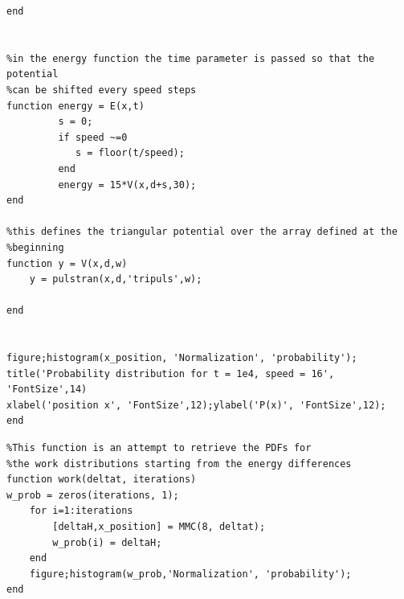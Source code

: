 \documentclass[11pt,letterpaper]{article}
\begin{document}
\begin{lstlisting}
end


%in the energy function the time parameter is passed so that the potential
%can be shifted every speed steps
function energy = E(x,t)
         s = 0;
         if speed ~=0
            s = floor(t/speed);
         end
         energy = 15*V(x,d+s,30);
end 

%this defines the triangular potential over the array defined at the
%beginning
function y = V(x,d,w)
    y = pulstran(x,d,'tripuls',w);
      
end


figure;histogram(x_position, 'Normalization', 'probability');
title('Probability distribution for t = 1e4, speed = 16', 'FontSize',14)
xlabel('position x', 'FontSize',12);ylabel('P(x)', 'FontSize',12);
end
\end{lstlisting}

\begin{lstlisting}
%This function is an attempt to retrieve the PDFs for 
%the work distributions starting from the energy differences
function work(deltat, iterations)
w_prob = zeros(iterations, 1);
    for i=1:iterations
        [deltaH,x_position] = MMC(8, deltat);
        w_prob(i) = deltaH;
    end
    figure;histogram(w_prob,'Normalization', 'probability');
end
\end{lstlisting}
\end{document}
